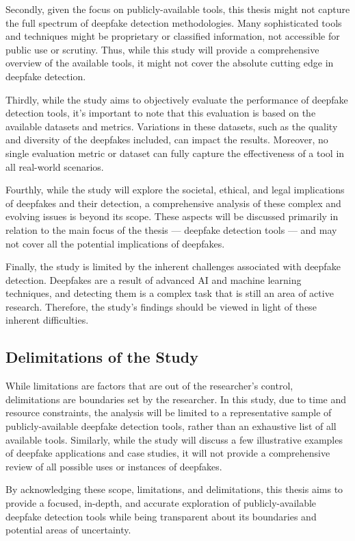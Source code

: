 Secondly, given the focus on publicly-available tools, this thesis might not capture 
the full spectrum of deepfake detection methodologies. Many sophisticated tools and 
techniques might be proprietary or classified information, not accessible for public 
use or scrutiny. Thus, while this study will provide a comprehensive overview of the 
available tools, it might not cover the absolute cutting edge in deepfake detection.

Thirdly, while the study aims to objectively evaluate the performance of deepfake 
detection tools, it's important to note that this evaluation is based on the 
available datasets and metrics. Variations in these datasets, such as the quality 
and diversity of the deepfakes included, can impact the results. Moreover, no 
single evaluation metric or dataset can fully capture the effectiveness of a tool 
in all real-world scenarios.

Fourthly, while the study will explore the societal, ethical, and legal implications 
of deepfakes and their detection, a comprehensive analysis of these complex and 
evolving issues is beyond its scope. These aspects will be discussed primarily in 
relation to the main focus of the thesis --- deepfake detection tools --- and may not 
cover all the potential implications of deepfakes.

Finally, the study is limited by the inherent challenges associated with deepfake 
detection. Deepfakes are a result of advanced \ac{AI} and machine learning techniques, 
and detecting them is a complex task that is still an area of active research. 
Therefore, the study's findings should be viewed in light of these inherent difficulties.

\subsection{Delimitations of the Study}
While limitations are factors that are out of the researcher's control, delimitations 
are boundaries set by the researcher. In this study, due to time and resource constraints, 
the analysis will be limited to a representative sample of publicly-available deepfake 
detection tools, rather than an exhaustive list of all available tools. Similarly, while 
the study will discuss a few illustrative examples of deepfake applications and case 
studies, it will not provide a comprehensive review of all possible uses or instances 
of deepfakes.

By acknowledging these scope, limitations, and delimitations, this thesis aims to 
provide a focused, in-depth, and accurate exploration of publicly-available deepfake 
detection tools while being transparent about its boundaries and potential areas of 
uncertainty.

